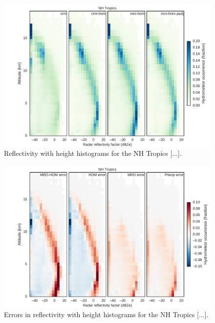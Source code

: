 \begin{figure}
\centering
\includegraphics[width=\columnwidth]{graphics/subgrid1_cfadDbze94_NHTropics.pdf}
\caption{Reflectivity with height histograms for the NH Tropics [...].}
\label{subgrid1_cfadDbze94_tropics}
\end{figure}

\begin{figure}
\centering
\includegraphics[width=\columnwidth]{graphics/subgrid1_cfadDbze94_NHTropics_diff.pdf}
\caption{Errors in reflectivity with height histograms for the NH Tropics [...].}
\label{subgrid1_cfadDbze94_tropics_diff}
\end{figure}

